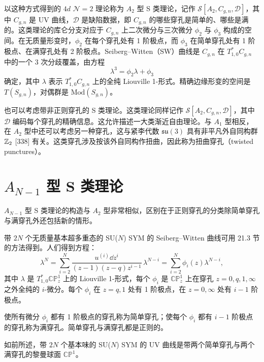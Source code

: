 \begin{definition}[21.34] 以这种方式得到的 $4d$ $\mathcal{N}=2$ 理论称为 $A_2$ 型 S 类理论，记作 $\mathcal{S}[A_2,C_{g,n},\mathcal{D}]$，其中 $C_{g,n}$ 是 UV 曲线，$\mathcal{D}$ 是缺陷数据，即 $C_{g,n}$ 的哪些穿孔是简单的、哪些是满的。这类理论的库仑分支对应于 $C_{g,n}$ 上二次微分与三次微分 $\phi_2$ 与 $\phi_3$ 构成的空间。在无质量形变时，$\phi_2$ 在每个穿孔处有 1 阶极点，而 $\phi_3$ 在简单穿孔处有 1 阶极点、在满穿孔处有 2 阶极点。Seiberg–Witten（SW）曲线是 $C_{g,n}$ 在 $T^*_{1,0}C_{g,n}$ 中的一个 3 次分歧覆盖，由方程
\[
\lambda^3=\phi_2\lambda+\phi_3
\]
确定，其中 $\lambda$ 表示 $T^*_{1,0}C_{g,n}$ 上的全纯 Liouville 1-形式。精确边缘形变的空间是 $T(S_{g,n})$，对偶群是 $\mathrm{Mod}(S_{g,n})$。
\end{definition}

\begin{remark}[21.35] 也可以考虑带非正则穿孔的 S 类理论。这类理论同样记作 $\mathcal{S}[A_2,C_{g,n},\mathcal{D}]$，其中 $\mathcal{D}$ 编码每个穿孔的精确信息。这允许描述一大类渐近自由理论。与 $A_1$ 型相反，在 $A_2$ 型中还可以考虑另一种穿孔，这与紧李代数 $\mathfrak{su}(3)$ 具有非平凡外自同构群 $\mathbb{Z}_2$ [338] 有关。这类穿孔涉及按该外自同构作扭曲，因此称为扭曲穿孔（twisted punctures）。
\end{remark}

\section{$A_{N-1}$ 型 S 类理论}

$A_{N-1}$ 型 S 类理论的构造与 $A_2$ 型非常相似，区别在于正则穿孔的分类除简单穿孔与满穿孔外还包括新的情形。

带 $2N$ 个无质量基本超多重态的 SU($N$) SYM 的 Seiberg–Witten 曲线可用 21.3 节的方法得到。人们得到方程：
\[
\lambda^N=\sum_{i=2}^{N}\frac{u^{(i)}\dd z^i}{(z-1)(z-q)z^{i-1}}\,\lambda^{N-i}
=\sum_{i=2}^{N}\phi_i(z)\lambda^{N-i},
\]
其中 $\lambda$ 是 $T^*_{1,0}\mathbb{CP}^1_z$ 上的 Liouville 1-形式，每个 $\phi_i$ 是 $\mathbb{CP}^1_z$ 上在穿孔 $z=0,q,1,\infty$ 之外全纯的 $i$-微分。每个 $\phi_i$ 在 $z=q,1$ 处有 1 阶极点，在 $z=0,\infty$ 处有 $i-1$ 阶极点。

\begin{definition}[21.36] 使所有微分 $\phi_i$ 都有 1 阶极点的穿孔称为简单穿孔；使每个 $\phi_i$ 都有 $i-1$ 阶极点的穿孔称为满穿孔。简单穿孔与满穿孔都是正则的。
\end{definition}

如前所述，带 $2N$ 个基本味的 SU($N$) SYM 的 UV 曲线是带两个简单穿孔与两个满穿孔的黎曼球面 $\mathbb{CP}^1$。

